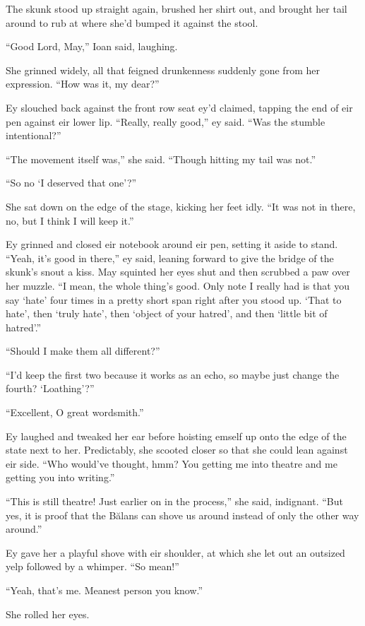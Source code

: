 The skunk stood up straight again, brushed her shirt out, and brought her tail around to rub at where she'd bumped it against the stool.

``Good Lord, May,'' Ioan said, laughing.

She grinned widely, all that feigned drunkenness suddenly gone from her expression. ``How was it, my dear?''

Ey slouched back against the front row seat ey'd claimed, tapping the end of eir pen against eir lower lip. ``Really, really good,'' ey said. ``Was the stumble intentional?''

``The movement itself was,'' she said. ``Though hitting my tail was not.''

``So no `I deserved that one'?''

She sat down on the edge of the stage, kicking her feet idly. ``It was not in there, no, but I think I will keep it.''

Ey grinned and closed eir notebook around eir pen, setting it aside to stand. ``Yeah, it's good in there,'' ey said, leaning forward to give the bridge of the skunk's snout a kiss. May squinted her eyes shut and then scrubbed a paw over her muzzle. ``I mean, the whole thing's good. Only note I really had is that you say `hate' four times in a pretty short span right after you stood up. `That to hate', then `truly hate', then `object of your hatred', and then `little bit of hatred'.''

``Should I make them all different?''

``I'd keep the first two because it works as an echo, so maybe just change the fourth? `Loathing'?''

``Excellent, O great wordsmith.''

Ey laughed and tweaked her ear before hoisting emself up onto the edge of the state next to her. Predictably, she scooted closer so that she could lean against eir side. ``Who would've thought, hmm? You getting me into theatre and me getting you into writing.''

``This is still theatre! Just earlier on in the process,'' she said, indignant. ``But yes, it is proof that the Bălans can shove us around instead of only the other way around.''

Ey gave her a playful shove with eir shoulder, at which she let out an outsized yelp followed by a whimper. ``So mean!''

``Yeah, that's me. Meanest person you know.''

She rolled her eyes.

